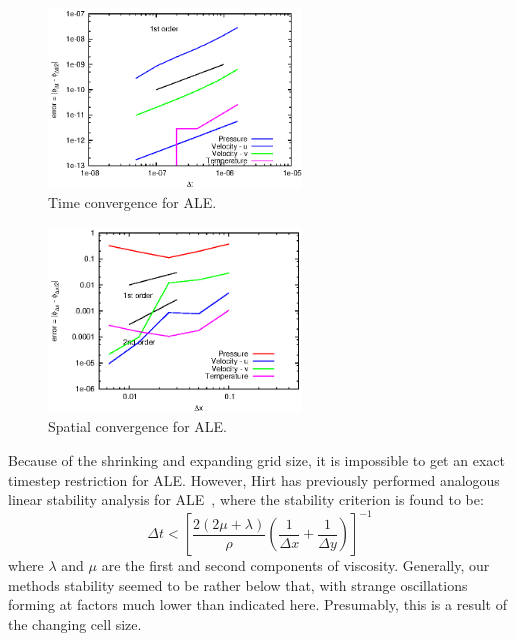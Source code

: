 \documentclass{article}
\begin{document}
\begin{figure}
    \centering
    \includegraphics[width=0.6\textwidth]{timeconvALE.eps}         
    \caption{Time convergence for ALE.}
    \label{fig:timeconvALE}
  \end{figure}
\begin{figure}
    \centering
    \includegraphics[width=0.6\textwidth]{spaceconvALE.eps}         
    \caption{Spatial convergence for ALE.}
    \label{fig:spaceconvALE}
  \end{figure}
  
Because of the shrinking and expanding grid size, it is impossible to get an exact timestep restriction for ALE.  However, Hirt has previously performed analogous linear stability analysis for ALE~\cite{hirt74}, where the stability criterion is found to be:
\begin{equation}
  \Delta t < \left[ \frac{2(2\mu + \lambda)}{\rho}\left(\frac{1}{\Delta x} + \frac{1}{\Delta y}\right)\right]^{-1}
\end{equation}
where $\lambda$ and $\mu$ are the first and second components of viscosity.  Generally, our methods stability seemed to be rather below that, with strange oscillations forming at factors much lower than indicated here.  Presumably, this is a result of the changing cell size.
\end{document}
